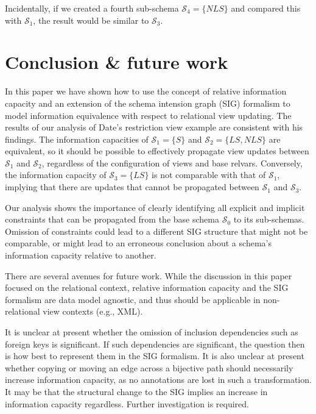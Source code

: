 \documentclass{sig-alternate-05-2015}
\newcounter{constraint}
\newcommand{\LS}{\ensuremath{\mathit{LS}}}
\newcommand{\NLS}{\ensuremath{\mathit{NLS}}}
\newcommand{\SC}[1]{\ensuremath{\mathcal{S}_{#1}}}
\begin{document}
Incidentally, if we created a fourth sub-schema \(\SC{4} = \{\NLS\}\) and compared this with \(\SC{1}\), the result would be similar to \(\SC{3}\).




\section{Conclusion \& future work}
\label{sec-conclusion}

\noindent In this paper we have shown how to use the concept of relative information capacity and an extension of the schema intension graph (SIG) formalism to model information equivalence with respect to relational view updating. The results of our analysis of Date's restriction view example \cite{Date.C-2013a-View} are consistent with his findings. The information capacities of \(\SC{1} = \{S\}\) and \(\SC{2} = \{\LS,\NLS\}\) are equivalent, so it should be possible to effectively propagate view updates between \(\SC{1}\) and \(\SC{2}\), regardless of the configuration of views and base relvars. Conversely, the information capacity of \(\SC{3} = \{\LS\}\) is not comparable with that of \(\SC{1}\), implying that there are updates that cannot be propagated between \(\SC{1}\) and \(\SC{3}\).

Our analysis shows the importance of clearly identifying all explicit and implicit constraints that can be propagated from the base schema \(\SC{0}\) to its sub-schemas. Omission of constraints could lead to a different SIG structure that might not be comparable, or might lead to an erroneous conclusion about a schema's information capacity relative to another.

There are several avenues for future work. While the discussion in this paper focused on the relational context, relative information capacity and the SIG formalism are data model agnostic, and thus should be applicable in non-relational view contexts (e.g., XML).

It is unclear at present whether the omission of inclusion dependencies such as foreign keys is significant. If such dependencies are significant, the question then is how best to represent them in the SIG formalism. It is also unclear at present whether copying or moving an edge across a bijective path should necessarily increase information capacity, as no annotations are lost in such a transformation. It may be that the structural change to the SIG implies an increase in information capacity regardless. Further investigation is required.
\end{document}
